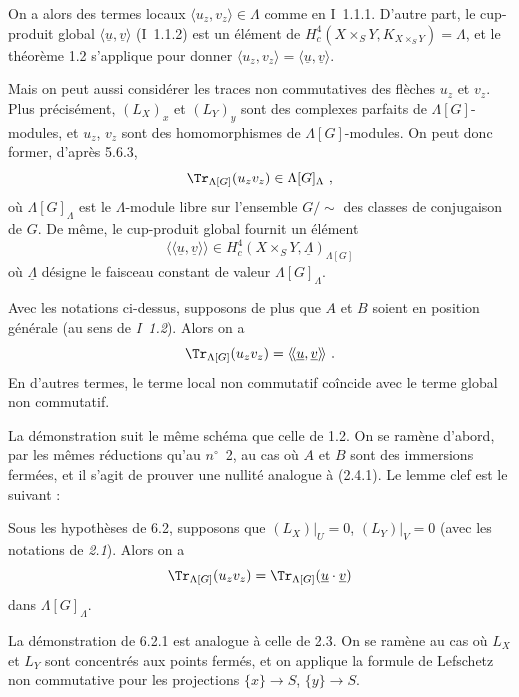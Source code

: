 On a alors des termes locaux $\langle u_z, v_z \rangle \in \Lambda$ comme en I~1.1.1. D'autre part, le cup-produit global $\langle \underline{u}, \underline{v} \rangle$ (I~1.1.2) est un \'el\'ement de $H^4_c(X \times_S Y, K_{X \times_S Y}) = \Lambda$, et le th\'eor\`eme 1.2 s'applique pour donner $\langle u_z, v_z \rangle = \langle \underline{u}, \underline{v} \rangle$.

Mais on peut aussi consid\'erer les traces non commutatives des fl\`eches $u_z$ et $v_z$. Plus pr\'ecis\'ement, $(L_X)_x$ et $(L_Y)_y$ sont des complexes parfaits de $\Lambda[G]$-modules, et $u_z$, $v_z$ sont des homomorphismes de $\Lambda[G]$-modules. On peut donc former, d'apr\`es 5.6.3,
\[
\Tr_{\Lambda[G]}(u_z v_z) \in \Lambda[G]_\Lambda \ ,
\]
o\`u $\Lambda[G]_\Lambda$ est le $\Lambda$-module libre sur l'ensemble $G/\sim$ des classes de conjugaison de $G$. De m\^eme, le cup-produit global fournit un \'el\'ement
\[
\langle\!\langle \underline{u}, \underline{v} \rangle\!\rangle \in H^4_c(X \times_S Y, \underline{\Lambda})_{\Lambda[G]}
\]
o\`u $\underline{\Lambda}$ d\'esigne le faisceau constant de valeur $\Lambda[G]_\Lambda$.

\begin{theoreme}[6.2]\label{thm:6.2}
Avec les notations ci-dessus, supposons de plus que $A$ et $B$ soient en position g\'en\'erale (au sens de \emph{I~1.2}). Alors on a
\[
\Tr_{\Lambda[G]}(u_z v_z) = \langle\!\langle \underline{u}, \underline{v} \rangle\!\rangle \ .
\]
En d'autres termes, le terme local non commutatif co\^incide avec le terme global non commutatif.
\end{theoreme}

La d\'emonstration suit le m\^eme sch\'ema que celle de 1.2. On se ram\`ene d'abord, par les m\^emes r\'eductions qu'au $n^{\circ}$~2, au cas o\`u $A$ et $B$ sont des immersions ferm\'ees, et il s'agit de prouver une nullit\'e analogue \`a (2.4.1). Le lemme clef est le suivant :

\begin{lemme}[6.2.1]\label{lem:6.2.1}
Sous les hypoth\`eses de 6.2, supposons que $(L_X)|_U = 0$, $(L_Y)|_V = 0$ (avec les notations de \emph{2.1}). Alors on a
\[
\Tr_{\Lambda[G]}(u_z v_z) = \Tr_{\Lambda[G]}(\underline{u} \cdot \underline{v})
\]
dans $\Lambda[G]_\Lambda$.
\end{lemme}

La d\'emonstration de 6.2.1 est analogue \`a celle de 2.3. On se ram\`ene au cas o\`u $L_X$ et $L_Y$ sont concentr\'es aux points ferm\'es, et on applique la formule de Lefschetz non commutative pour les projections $\{x\} \longrightarrow S$, $\{y\} \longrightarrow S$.

